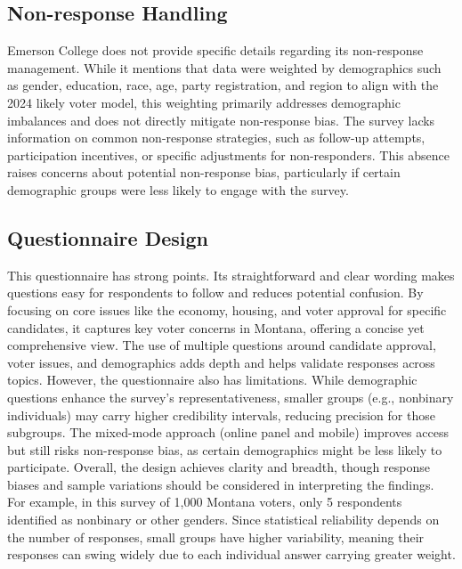 \documentclass[
  letterpaper,
  DIV=11,
  numbers=noendperiod]{scrartcl}
\begin{document}
\hypertarget{non-response-handling}{%
\subsection{Non-response Handling}\label{non-response-handling}}

Emerson College does not provide specific details regarding its
non-response management. While it mentions that data were weighted by
demographics such as gender, education, race, age, party registration,
and region to align with the 2024 likely voter model, this weighting
primarily addresses demographic imbalances and does not directly
mitigate non-response bias. The survey lacks information on common
non-response strategies, such as follow-up attempts, participation
incentives, or specific adjustments for non-responders. This absence
raises concerns about potential non-response bias, particularly if
certain demographic groups were less likely to engage with the survey.

\hypertarget{questionnaire-design}{%
\subsection{Questionnaire Design}\label{questionnaire-design}}

This questionnaire has strong points. Its straightforward and clear
wording makes questions easy for respondents to follow and reduces
potential confusion. By focusing on core issues like the economy,
housing, and voter approval for specific candidates, it captures key
voter concerns in Montana, offering a concise yet comprehensive view.
The use of multiple questions around candidate approval, voter issues,
and demographics adds depth and helps validate responses across topics.
However, the questionnaire also has limitations. While demographic
questions enhance the survey's representativeness, smaller groups (e.g.,
nonbinary individuals) may carry higher credibility intervals, reducing
precision for those subgroups. The mixed-mode approach (online panel and
mobile) improves access but still risks non-response bias, as certain
demographics might be less likely to participate. Overall, the design
achieves clarity and breadth, though response biases and sample
variations should be considered in interpreting the findings. For
example, in this survey of 1,000 Montana voters, only 5 respondents
identified as nonbinary or other genders. Since statistical reliability
depends on the number of responses, small groups have higher
variability, meaning their responses can swing widely due to each
individual answer carrying greater weight.
\end{document}
